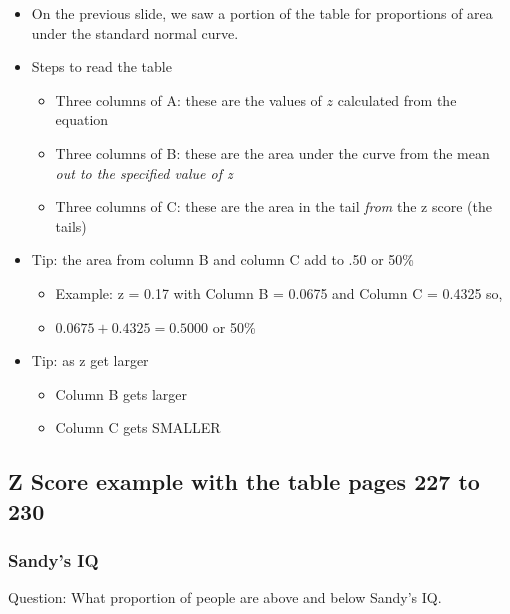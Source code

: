 \documentclass[]{article}
\begin{document}
\begin{itemize}
\itemsep1pt\parskip0pt
\item
  On the previous slide, we saw a portion of the table for proportions
  of area under the standard normal curve.
\item
  Steps to read the table

  \begin{itemize}
  \itemsep1pt\parskip0pt
  \item
    Three columns of A: these are the values of $z$ calculated from the
    equation
  \item
    Three columns of B: these are the area under the curve from the mean
    \emph{out to the specified value of z}
  \item
    Three columns of C: these are the area in the tail \emph{from} the z
    score (the tails)
  \end{itemize}
\item
  Tip: the area from column B and column C add to .50 or 50\%

  \begin{itemize}
  \itemsep1pt\parskip0pt
  \item
    Example: z = 0.17 with Column B = 0.0675 and Column C = 0.4325 so,
  \item
    $0.0675 + 0.4325 = 0.5000$ or 50\%
  \end{itemize}
\item
  Tip: as z get larger

  \begin{itemize}
  \itemsep1pt\parskip0pt
  \item
    Column B gets larger
  \item
    Column C gets SMALLER
  \end{itemize}
\end{itemize}

\subsection{Z Score example with the table pages 227 to
230}\label{z-score-example-with-the-table-pages-227-to-230}

\subsubsection{Sandy's IQ}\label{sandys-iq}

Question: What proportion of people are above and below Sandy's IQ.
\end{document}
